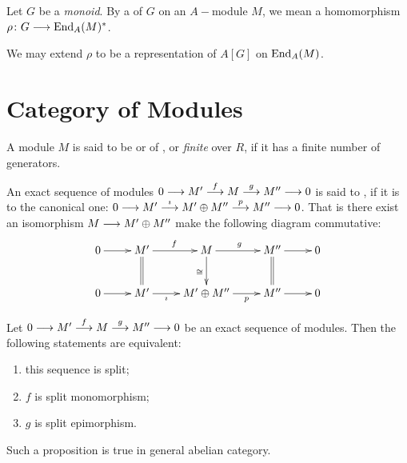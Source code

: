   \begin{defn}
    Let $G$ be a \emph{monoid}. By a  of $G$ on an $A-$module $M$, we mean a homomorphism $\rho\colon G\longrightarrow \operatorname{End}_A(M)^{\ast}$.
  \end{defn}
  \begin{rem}
    We may extend $\rho$ to be a representation of $A[G]$ on $\operatorname{End}_A(M)$.
  \end{rem}

\newpage\section{Category of Modules}
  \begin{defn}
    A module $M$ is said to be  or of , or \emph{\red finite} over $R$, if it has a finite number of generators.
  \end{defn}
  \begin{defn}
    An exact sequence of modules $0\longrightarrow{M'} \stackrel{{{f}}}{\longrightarrow} {M} \stackrel{{{g}}}{\longrightarrow} {M''}\longrightarrow0$ is said to , if it is  to the canonical one: $0\longrightarrow{M'} \stackrel{{{\imath}}}{\longrightarrow} {M'\oplus M''} \stackrel{{{p}}}{\longrightarrow} {M''}\longrightarrow0$. That is there exist an isomorphism $M\longrightarrow M'\oplus M''$ make the following diagram commutative:
  \begin{displaymath}
      \xymatrix{
         0\ar[r] & M'\ar[r]^{f}\ar@{=}[d] & M\ar[r]^{g}\ar[d]_{\cong} & M''\ar[r]\ar@{=}[d] & 0 \\
         0\ar[r] & M'\ar[r]_-{\imath} & M'\oplus M''\ar[r]_-{p} & M''\ar[r] & 0
      }
  \end{displaymath}
  \end{defn}

  \begin{prop}
    Let $0\longrightarrow{M'} \stackrel{{{f}}}{\longrightarrow} {M} \stackrel{{{g}}}{\longrightarrow} {M''}\longrightarrow0$ be an exact sequence of modules. Then the following statements are equivalent:
    \begin{enumerate}
      \setlength{\itemindent}{2ex}
      \item this sequence is split;
      \item $f$ is split monomorphism;
      \item $g$ is split epimorphism.
    \end{enumerate}
  \end{prop}
  \begin{rem}
    Such a proposition is true in general abelian category.
  \end{rem}

